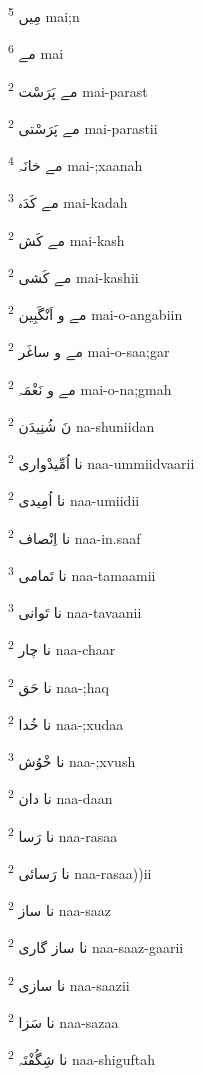 \documentclass[12pt]{article}
\begin{document}
\begin{multicols}{5}
{\ur مِیں}   \textsuperscript{5} mai;n

{\ur مے}   \textsuperscript{6} mai

{\ur مے پَرَسْت}   \textsuperscript{2} mai-parast

{\ur مے پَرَسْتی}   \textsuperscript{2} mai-parastii

{\ur مے خانَہ}   \textsuperscript{4} mai-;xaanah

{\ur مے کَدَہ}   \textsuperscript{3} mai-kadah

{\ur مے کَش}   \textsuperscript{2} mai-kash

{\ur مے کَشی}   \textsuperscript{2} mai-kashii

{\ur مے و اَنْگَبِین}   \textsuperscript{2} mai-o-angabiin

{\ur مے و ساغَر}   \textsuperscript{2} mai-o-saa;gar

{\ur مے و نَغْمَہ}   \textsuperscript{2} mai-o-na;gmah

{\ur نَ شُنِیدَن}   \textsuperscript{2} na-shuniidan

{\ur نا اُمِّیدْواری}   \textsuperscript{2} naa-ummiidvaarii

{\ur نا اُمِیدی}   \textsuperscript{2} naa-umiidii

{\ur نا اِنْصاف}   \textsuperscript{2} naa-in.saaf

{\ur نا تَمامی}   \textsuperscript{3} naa-tamaamii

{\ur نا تَوانی}   \textsuperscript{3} naa-tavaanii

{\ur نا چار}   \textsuperscript{2} naa-chaar

{\ur نا حَق}   \textsuperscript{2} naa-;haq

{\ur نا خُدا}   \textsuperscript{2} naa-;xudaa

{\ur نا خْوُش}   \textsuperscript{3} naa-;xvush

{\ur نا دان}   \textsuperscript{2} naa-daan

{\ur نا رَسا}   \textsuperscript{2} naa-rasaa

{\ur نا رَسائی}   \textsuperscript{2} naa-rasaa))ii

{\ur نا ساز}   \textsuperscript{2} naa-saaz

{\ur نا ساز گاری}   \textsuperscript{2} naa-saaz-gaarii

{\ur نا سازی}   \textsuperscript{2} naa-saazii

{\ur نا سَزا}   \textsuperscript{2} naa-sazaa

{\ur نا شِگُفْتَہ}   \textsuperscript{2} naa-shiguftah


\end{multicols}
\end{document}
